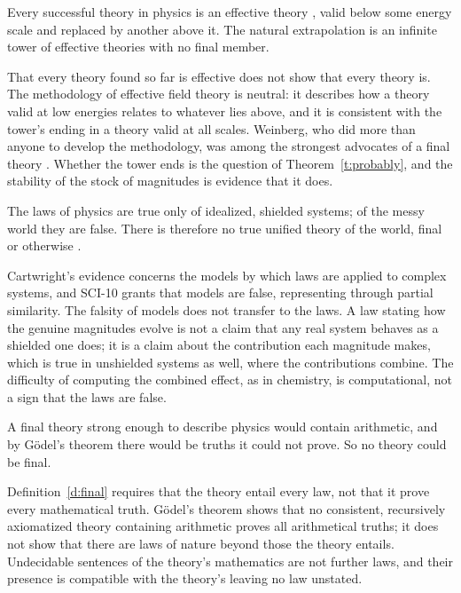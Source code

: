 \documentclass{situationist-preprint}
\begin{document}
\begin{objection}
Every successful theory in physics is an effective theory \citep{Weinberg1979}, valid below some energy scale and replaced by another above it. The natural extrapolation is an infinite tower of effective theories with no final member.
\end{objection}

\begin{reply}
That every theory found so far is effective does not show that every theory is. The methodology of effective field theory is neutral: it describes how a theory valid at low energies relates to whatever lies above, and it is consistent with the tower's ending in a theory valid at all scales. Weinberg, who did more than anyone to develop the methodology, was among the strongest advocates of a final theory \citep{Weinberg1992}. Whether the tower ends is the question of Theorem~\ref{t:probably}, and the stability of the stock of magnitudes is evidence that it does.
\end{reply}

\begin{objection}
The laws of physics are true only of idealized, shielded systems; of the messy world they are false. There is therefore no true unified theory of the world, final or otherwise \citep{Cartwright1999}.
\end{objection}

\begin{reply}
Cartwright's evidence concerns the models by which laws are applied to complex systems, and SCI-10 grants that models are false, representing through partial similarity. The falsity of models does not transfer to the laws. A law stating how the genuine magnitudes evolve is not a claim that any real system behaves as a shielded one does; it is a claim about the contribution each magnitude makes, which is true in unshielded systems as well, where the contributions combine. The difficulty of computing the combined effect, as in chemistry, is computational, not a sign that the laws are false.
\end{reply}

\begin{objection}[Incompleteness]
A final theory strong enough to describe physics would contain arithmetic, and by Gödel's theorem there would be truths it could not prove. So no theory could be final.
\end{objection}

\begin{reply}
Definition~\ref{d:final} requires that the theory entail every law, not that it prove every mathematical truth. Gödel's theorem shows that no consistent, recursively axiomatized theory containing arithmetic proves all arithmetical truths; it does not show that there are laws of nature beyond those the theory entails. Undecidable sentences of the theory's mathematics are not further laws, and their presence is compatible with the theory's leaving no law unstated.
\end{reply}
\end{document}
